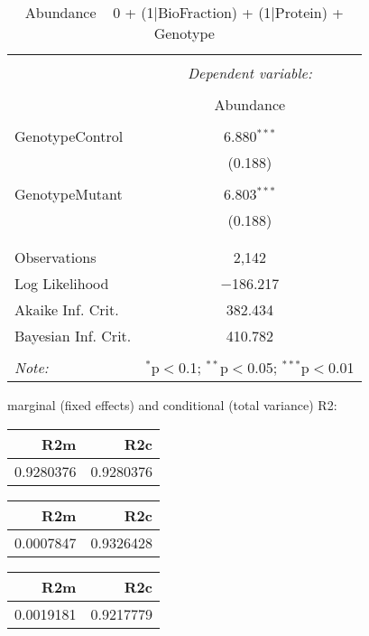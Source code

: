 \documentclass[11pt]{report}
\begin{document}
\begin{table}[!htbp] \centering 
  \caption{Abundance ~ 0 + (1|BioFraction) + (1|Protein) + Genotype} 
  \label{} 
\begin{tabular}{@{\extracolsep{5pt}}lc} 
\\[-1.8ex]\hline 
\hline \\[-1.8ex] 
 & \multicolumn{1}{c}{\textit{Dependent variable:}} \\ 
\cline{2-2} 
\\[-1.8ex] & Abundance \\ 
\hline \\[-1.8ex] 
 GenotypeControl & 6.880$^{***}$ \\ 
  & (0.188) \\ 
  & \\ 
 GenotypeMutant & 6.803$^{***}$ \\ 
  & (0.188) \\ 
  & \\ 
\hline \\[-1.8ex] 
Observations & 2,142 \\ 
Log Likelihood & $-$186.217 \\ 
Akaike Inf. Crit. & 382.434 \\ 
Bayesian Inf. Crit. & 410.782 \\ 
\hline 
\hline \\[-1.8ex] 
\textit{Note:}  & \multicolumn{1}{r}{$^{*}$p$<$0.1; $^{**}$p$<$0.05; $^{***}$p$<$0.01} \\ 
\end{tabular} 
\end{table} 
marginal (fixed effects) and conditional (total variance) R2:

\begin{tabular}{r|r}
\hline
R2m & R2c\\
\hline
0.9280376 & 0.9280376\\
\hline
\end{tabular}

\begin{tabular}{r|r}
\hline
R2m & R2c\\
\hline
0.0007847 & 0.9326428\\
\hline
\end{tabular}

\begin{tabular}{r|r}
\hline
R2m & R2c\\
\hline
0.0019181 & 0.9217779\\
\hline
\end{tabular}
\end{document}
